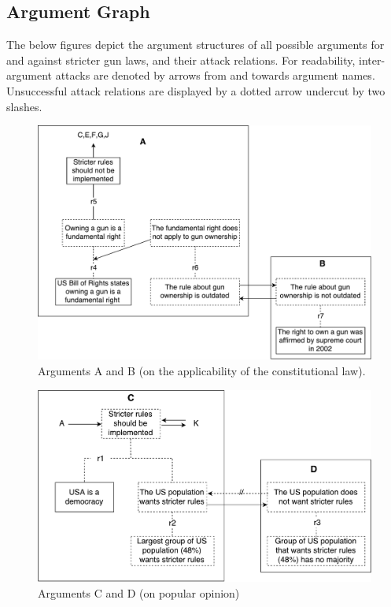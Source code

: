 \documentclass[]{article}
\begin{document}
\subsection{Argument Graph}
The below figures depict the argument structures of all possible arguments for and against stricter gun laws, and their attack relations. For readability, inter-argument attacks are denoted by arrows from and towards argument names. Unsuccessful attack relations are displayed by a dotted arrow undercut by two slashes.

\begin{figure}
\includegraphics[scale=0.5]{images/AB.pdf}
\caption{Arguments A and B (on the applicability of the constitutional law).}
\end{figure}
\begin{figure}
\includegraphics[scale=0.5]{images/CD.pdf}
\caption{Arguments C and D (on popular opinion)}
\end{figure}
\end{document}
